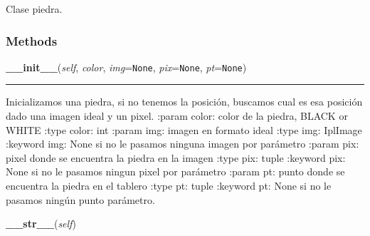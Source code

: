     \label{src:stone:Stone}
Clase piedra.



  \subsubsection{Methods}

    \label{src:stone:Stone:__init__}

    \vspace{0.5ex}

\hspace{.8\funcindent}\begin{boxedminipage}{\funcwidth}

    \raggedright \textbf{\_\_init\_\_}(\textit{self}, \textit{color}, \textit{img}={\tt None}, \textit{pix}={\tt None}, \textit{pt}={\tt None})

    \vspace{-1.5ex}

    \rule{\textwidth}{0.5\fboxrule}
\setlength{\parskip}{2ex}
    Inicializamos una piedra, si no tenemos la posición, buscamos cual es 
    esa posición dado una imagen ideal y un pixel. :param color: color de 
    la piedra, BLACK or WHITE :type color: int :param img: imagen en 
    formato ideal :type img: IplImage :keyword img: None si no le pasamos 
    ninguna imagen por parámetro :param pix: pixel donde se encuentra la 
    piedra en la imagen :type pix: tuple :keyword pix: None si no le 
    pasamos ningun pixel por parámetro :param pt: punto donde se encuentra 
    la piedra en el tablero :type pt: tuple :keyword pt: None si no le 
    pasamos ningún punto parámetro.

\setlength{\parskip}{1ex}
    \end{boxedminipage}

    \label{src:stone:Stone:__str__}

    \vspace{0.5ex}

\hspace{.8\funcindent}\begin{boxedminipage}{\funcwidth}

    \raggedright \textbf{\_\_str\_\_}(\textit{self})

\setlength{\parskip}{2ex}
\setlength{\parskip}{1ex}
    \end{boxedminipage}

